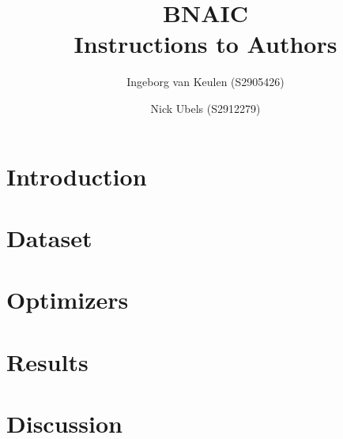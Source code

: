 \documentclass{article}
\title{\textbf{\huge BNAIC\\ Instructions to Authors}}%
\author{Ingeborg van Keulen (S2905426) \and
    Nick Ubels (S2912279)}
\begin{document}
\ttl
\thispagestyle{empty}

\section{Introduction}

\section{Dataset}

\section{Optimizers}

\section{Results}

\section{Discussion}

%
%
%
\end{document}
